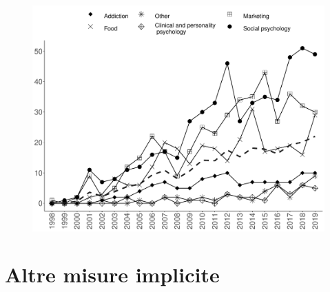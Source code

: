 \documentclass[compress]{beamer}
\begin{document}
\begin{frame}
	\begin{figure}
		\includegraphics[width=.80\linewidth]{yearsIAT.pdf}
	\end{figure}
\end{frame}

\section[Altre misure]{Altre misure implicite}
\end{document}
